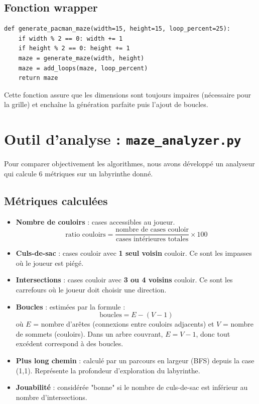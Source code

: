 \documentclass[12pt,a4paper]{article}
\begin{document}
\subsection{Fonction wrapper}

\begin{lstlisting}[caption={Génération complète d'un labyrinthe Pac-Man}]
def generate_pacman_maze(width=15, height=15, loop_percent=25):
    if width % 2 == 0: width += 1
    if height % 2 == 0: height += 1
    maze = generate_maze(width, height)
    maze = add_loops(maze, loop_percent)
    return maze
\end{lstlisting}

Cette fonction assure que les dimensions sont toujours impaires (nécessaire pour la grille) et enchaîne la génération parfaite puis l'ajout de boucles.

\section{Outil d'analyse : \texttt{maze\_analyzer.py}}

Pour comparer objectivement les algorithmes, nous avons développé un analyseur qui calcule 6 métriques sur un labyrinthe donné.

\subsection{Métriques calculées}

\begin{itemize}
    \item \textbf{Nombre de couloirs} : cases accessibles au joueur.
    $$\text{ratio couloirs} = \frac{\text{nombre de cases couloir}}{\text{cases intérieures totales}} \times 100$$
    
    \item \textbf{Culs-de-sac} : cases couloir avec \textbf{1 seul voisin} couloir. Ce sont les impasses où le joueur est piégé.
    
    \item \textbf{Intersections} : cases couloir avec \textbf{3 ou 4 voisins} couloir. Ce sont les carrefours où le joueur doit choisir une direction.
    
    \item \textbf{Boucles} : estimées par la formule :
    $$\text{boucles} = E - (V - 1)$$
    où $E$ = nombre d'arêtes (connexions entre couloirs adjacents) et $V$ = nombre de sommets (couloirs). Dans un arbre couvrant, $E = V - 1$, donc tout excédent correspond à des boucles.
    
    \item \textbf{Plus long chemin} : calculé par un parcours en largeur (BFS) depuis la case (1,1). Représente la profondeur d'exploration du labyrinthe.
    
    \item \textbf{Jouabilité} : considérée "bonne" si le nombre de culs-de-sac est inférieur au nombre d'intersections.
\end{itemize}
\end{document}

